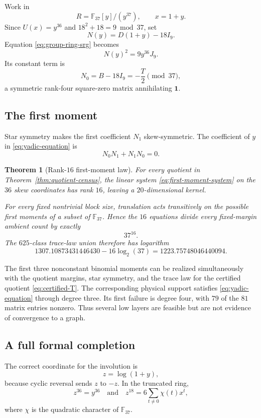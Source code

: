 \documentclass[11pt]{article}
\newtheorem{theorem}{Theorem}[section]
\theoremstyle{definition}
\newcommand{\F}{\mathbb{F}}
\newcommand{\one}{\mathbf{1}}
\begin{document}
Work in
\[
 R=\F_{37}[y]/(y^{37}),\qquad x=1+y.
\]
Since \(U(x)=y^{36}\) and \(18^2+18=9\bmod37\), set
\[
 N(y)=D(1+y)-18I_9.
\]
Equation \eqref{eq:group-ring-srg} becomes
\[
 N(y)^2=9y^{36}J_9.
\tag{7.1}\label{eq:yadic-equation}
\]
Its constant term is
\[
 N_0=B-18I_9=-\frac{T}{2}\pmod{37},
\tag{7.2}\label{eq:N0}
\]
a symmetric rank-four square-zero matrix annihilating \(\one\).

\subsection{The first moment}

Star symmetry makes the first coefficient \(N_1\) skew-symmetric.  The
coefficient of \(y\) in \eqref{eq:yadic-equation} is
\[
 N_0N_1+N_1N_0=0.
\tag{7.3}\label{eq:first-moment-system}
\]

\begin{theorem}[Rank-\(16\) first-moment law]
\label{thm:first-moment}
For every quotient in Theorem~\ref{thm:quotient-census}, the linear system
\eqref{eq:first-moment-system} on the \(36\) skew coordinates has rank
\(16\), leaving a \(20\)-dimensional kernel.

For every fixed nontrivial block size, translation acts transitively on
the possible first moments of a subset of \(\F_{37}\).  Hence the
\(16\) equations divide every fixed-margin ambient count by exactly
\[
37^{16}.
\tag{7.4}\label{eq:37^16}
\]
The \(625\)-class trace-law union therefore has logarithm
\[
1307.10873431446430-16\log_2(37)
=1223.75748046440094.
\tag{7.5}\label{eq:first-moment-union}
\]
\end{theorem}

The first three nonconstant binomial moments can be realized
simultaneously with the quotient margins, star symmetry, and the trace
law for the certified quotient \eqref{eq:certified-T}.  The corresponding
physical support satisfies \eqref{eq:yadic-equation} through degree three.
Its first failure is degree four, with \(79\) of the \(81\) matrix entries
nonzero.  Thus several low layers are feasible but are not evidence of
convergence to a graph.

\subsection{A full formal completion}

The correct coordinate for the involution is
\[
 z=\log(1+y),
\]
because cyclic reversal sends \(z\) to \(-z\).  In the truncated ring,
\[
 z^{36}=y^{36}
\quad\text{and}\quad
 z^{18}=6\sum_{t\neq0}\chi(t)x^t,
\tag{7.6}\label{eq:z18-paley}
\]
where \(\chi\) is the quadratic character of \(\F_{37}\).
\end{document}
